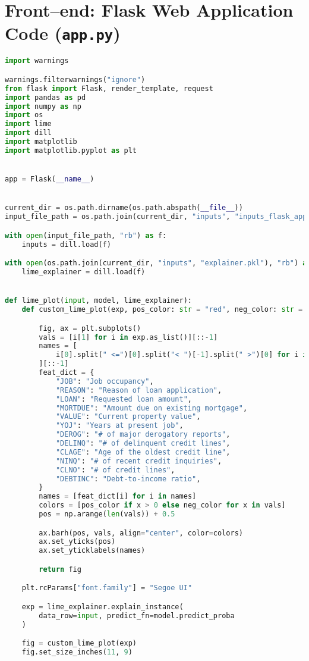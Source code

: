 \section{Front--end: Flask Web Application Code (\lstinline{app.py})}
\begin{lstlisting}[language=Python, basicstyle=\footnotesize\ttfamily]
import warnings

warnings.filterwarnings("ignore")
from flask import Flask, render_template, request
import pandas as pd
import numpy as np
import os
import lime
import dill
import matplotlib
import matplotlib.pyplot as plt


app = Flask(__name__)


current_dir = os.path.dirname(os.path.abspath(__file__))
input_file_path = os.path.join(current_dir, "inputs", "inputs_flask_app_dict.pkl")

with open(input_file_path, "rb") as f:
	inputs = dill.load(f)

with open(os.path.join(current_dir, "inputs", "explainer.pkl"), "rb") as f:
	lime_explainer = dill.load(f)


def lime_plot(input, model, lime_explainer):
	def custom_lime_plot(exp, pos_color: str = "red", neg_color: str = "green"):

		fig, ax = plt.subplots()
		vals = [i[1] for i in exp.as_list()][::-1]
		names = [
			i[0].split(" <=")[0].split("< ")[-1].split(" >")[0] for i in exp.as_list()
		][::-1]
		feat_dict = {
			"JOB": "Job occupancy",
			"REASON": "Reason of loan application",
			"LOAN": "Requested loan amount",
			"MORTDUE": "Amount due on existing mortgage",
			"VALUE": "Current property value",
			"YOJ": "Years at present job",
			"DEROG": "# of major derogatory reports",
			"DELINQ": "# of delinquent credit lines",
			"CLAGE": "Age of the oldest credit line",
			"NINQ": "# of recent credit inquiries",
			"CLNO": "# of credit lines",
			"DEBTINC": "Debt-to-income ratio",
		}
		names = [feat_dict[i] for i in names]
		colors = [pos_color if x > 0 else neg_color for x in vals]
		pos = np.arange(len(vals)) + 0.5

		ax.barh(pos, vals, align="center", color=colors)
		ax.set_yticks(pos)
		ax.set_yticklabels(names)

		return fig

	plt.rcParams["font.family"] = "Segoe UI"

	exp = lime_explainer.explain_instance(
		data_row=input, predict_fn=model.predict_proba
	)

	fig = custom_lime_plot(exp)
	fig.set_size_inches(11, 9)


\end{lstlisting}
